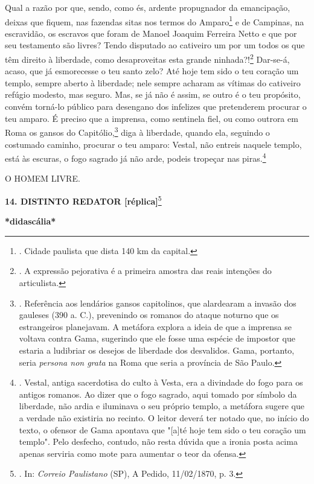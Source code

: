 Qual a razão por que, sendo, como és, ardente propugnador da
emancipação, deixas que fiquem, nas fazendas sitas nos termos do
Amparo\footnote{. Cidade paulista que dista 140 km da capital.} e de
Campinas, na escravidão, os escravos que foram de Manoel Joaquim
Ferreira Netto e que por seu testamento são livres? Tendo disputado ao
cativeiro um por um todos os que têm direito à liberdade, como
desaproveitas esta grande ninhada?!\footnote{. A expressão pejorativa é
  a primeira amostra das reais intenções do articulista.} Dar-se-á,
acaso, que já esmorecesse o teu santo zelo? Até hoje tem sido o teu
coração um templo, sempre aberto à liberdade; nele sempre acharam as
vítimas do cativeiro refúgio modesto, mas seguro. Mas, se já não é
assim, se outro é o teu propósito, convém torná-lo público para
desengano dos infelizes que pretenderem procurar o teu amparo. É preciso
que a imprensa, como sentinela fiel, ou como outrora em Roma os gansos
do Capitólio,\footnote{. Referência aos lendários gansos capitolinos,
  que alardearam a invasão dos gauleses (390 a. C.), prevenindo os
  romanos do ataque noturno que os estrangeiros planejavam. A metáfora
  explora a ideia de que a imprensa se voltava contra Gama, sugerindo
  que ele fosse uma espécie de impostor que estaria a ludibriar os
  desejos de liberdade dos desvalidos. Gama, portanto, seria
  \emph{persona non grata} na Roma que seria a província de São Paulo.}
diga à liberdade, quando ela, seguindo o costumado caminho, procurar o
teu amparo: Vestal, não entreis naquele templo, está às escuras, o fogo
sagrado já não arde, podeis tropeçar nas piras.\footnote{. Vestal,
  antiga sacerdotisa do culto à Vesta, era a divindade do fogo para os
  antigos romanos. Ao dizer que o fogo sagrado, aqui tomado por símbolo
  da liberdade, não ardia e iluminava o seu próprio templo, a metáfora
  sugere que a verdade não existiria no recinto. O leitor deverá ter
  notado que, no início do texto, o ofensor de Gama apontava que
  "{[}a{]}té hoje tem sido o teu coração um templo". Pelo desfecho,
  contudo, não resta dúvida que a ironia posta acima apenas serviria
  como mote para aumentar o teor da ofensa.}

O HOMEM LIVRE.

\textbf{14. DISTINTO REDATOR {[}réplica{]}}\footnote{. In: \emph{Correio
  Paulistano} (SP), A Pedido, 11/02/1870, p. 3.}

\textbf{*didascália*}

